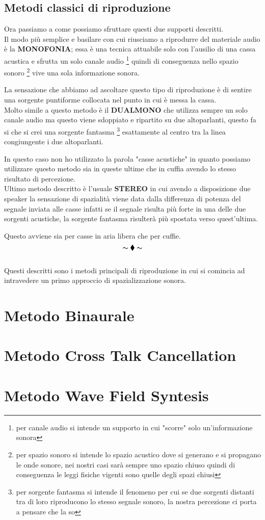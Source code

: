 \documentclass[12pt,a4paper]{report}
\begin{document}
\section{Metodi classici di riproduzione}

Ora passiamo a come possiamo sfruttare questi due supporti descritti.\\

Il modo più semplice e basilare con cui riusciamo a riprodurre del materiale audio è la \textbf{MONOFONIA}; essa è una tecnica attuabile solo con l'ausilio di una cassa acustica e sfrutta un solo canale audio \footnote{per canale audio si intende un supporto in cui "scorre" solo un'informazione sonora}
quindi di conseguenza nello spazio sonoro \footnote{per spazio sonoro si intende lo spazio acustico dove si generano e si propagano le onde sonore, nei nostri casi sarà sempre uno spazio chiuso quindi di conseguenza le leggi fisiche vigenti sono quelle degli spazi chiusi} vive una sola informazione sonora.

La sensazione che abbiamo ad ascoltare questo tipo di riproduzione è di sentire una sorgente puntiforme collocata nel punto in cui è messa la cassa.\\

Molto simile a questo metodo è il \textbf{DUALMONO} che utilizza sempre un solo canale audio ma questo viene sdoppiato e ripartito su due altoparlanti, questo fa si che si crei una sorgente fantasma \footnote{per sorgente fantasma si intende il fenomeno per cui se due sorgenti distanti tra di loro riproducono lo stesso segnale sonoro, la nostra percezione ci porta a pensare che la so} esattamente al centro tra la linea congiungente i due altoparlanti. 

In questo caso non ho utilizzato la parola "casse acustiche" in quanto possiamo utilizzare questo metodo sia in queste ultime che in cuffia avendo lo stesso risultato di percezione.\\

Ultimo metodo descritto è l'usuale \textbf{STEREO} in cui avendo a disposizione due speaker la sensazione di spazialità viene data dalla differenza di potenza del segnale inviata alle casse infatti se il segnale risulta più forte in una delle due sorgenti acustiche, la sorgente fantasma risulterà più spostata verso quest'ultima.

Questo avviene sia per casse in aria libera che per cuffie. \\

\[ \thicksim \blacklozenge \thicksim \]\\

Questi descritti sono i metodi principali di riproduzione in cui si comincia ad intravedere un primo approccio di spazializzazione	 sonora.

\chapter{Metodo Binaurale}

\chapter{Metodo Cross Talk Cancellation}

\chapter{Metodo Wave Field Syntesis}
\end{document}
